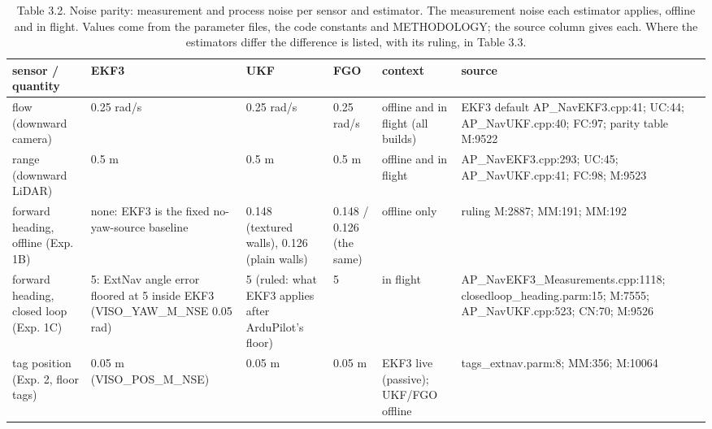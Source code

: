 \begin{table}[htbp]
\centering
\scriptsize
\caption{Table 3.2. Noise parity: measurement and process noise per sensor and estimator. The measurement noise each estimator applies, offline and in flight. Values come from the parameter files, the code constants and METHODOLOGY; the source column gives each. Where the estimators differ the difference is listed, with its ruling, in Table 3.3.}
\label{tab:3-2}
\begin{tabular}{p{}p{}p{}p{}p{}p{}}
\toprule
\textbf{sensor / quantity} & \textbf{EKF3} & \textbf{UKF} & \textbf{FGO} & \textbf{context} & \textbf{source} \\
\midrule
flow (downward camera) & 0.25 rad/s & 0.25 rad/s & 0.25 rad/s & offline and in flight (all builds) & EKF3 default AP\_NavEKF3.cpp:41; UC:44; AP\_NavUKF.cpp:40; FC:97; parity table M:9522 \\
range (downward LiDAR) & 0.5 m & 0.5 m & 0.5 m & offline and in flight & AP\_NavEKF3.cpp:293; UC:45; AP\_NavUKF.cpp:41; FC:98; M:9523 \\
forward heading, offline (Exp. 1B) & none: EKF3 is the fixed no-yaw-source baseline & 0.148\textdegree{} (textured walls), 0.126\textdegree{} (plain walls) & 0.148\textdegree{} / 0.126\textdegree{} (the same) & offline only & ruling M:2887; MM:191; MM:192 \\
forward heading, closed loop (Exp. 1C) & 5\textdegree{}: ExtNav angle error floored at 5\textdegree{} inside EKF3 (VISO\_YAW\_M\_NSE 0.05 rad) & 5\textdegree{} (ruled: what EKF3 applies after ArduPilot's floor) & 5\textdegree{} & in flight & AP\_NavEKF3\_Measurements.cpp:1118; closedloop\_heading.parm:15; M:7555; AP\_NavUKF.cpp:523; CN:70; M:9526 \\
tag position (Exp. 2, floor tags) & 0.05 m (VISO\_POS\_M\_NSE) & 0.05 m & 0.05 m & EKF3 live (passive); UKF/FGO offline & tags\_extnav.parm:8; MM:356; M:10064 \\

\end{tabular}
\end{table}
